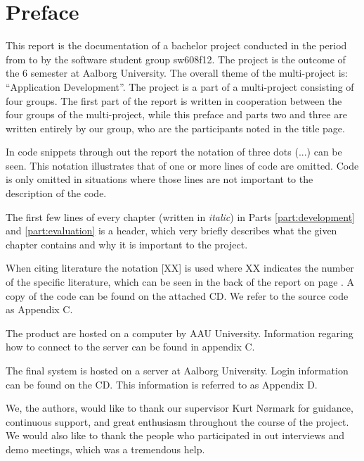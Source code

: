 \chapter*{Preface}
\label{chap:preface}
This report is the documentation of a bachelor project conducted in the period from  to  by the software student group sw608f12.
The project is the outcome of the 6\ths{} semester at Aalborg University. 
The overall theme of the multi-project is: ``Application Development''. 
The project is a part of a multi-project consisting of four groups. 
The first part of the report is written in cooperation between the four groups of the multi-project, while this preface and parts two and three are written entirely by our group, who are the participants noted in the title page.

In code snippets through out the report the notation of three dots (...)  can be seen.
This notation illustrates that of one or more lines of code are omitted. 
Code is only omitted in situations where those lines are not important to the description of the code. 

The first few lines of every chapter (written in \textit{italic}) in Parts \ref{part:development} and \ref{part:evaluation} is a header, which very briefly describes what the given chapter contains and why it is important to the project.

When citing literature the notation [XX] is used where XX indicates the number of the specific literature, which can be seen in the back of the report on page \pageref{chap:bib}.
A copy of the code can be found on the attached CD. 
We refer to the source code as Appendix C.

The product are hosted on a computer by AAU University. 
Information regaring how to connect to the server can be found in appendix C.

The final system is hosted on a server at Aalborg University.
Login information can be found on the CD.
This information is referred to as Appendix D.

We, the authors, would like to thank our supervisor Kurt N\o{}rmark for guidance, continuous support, and great enthusiasm throughout the course of the project.
We would also like to thank the people who participated in out interviews and demo meetings, which was a tremendous help.
